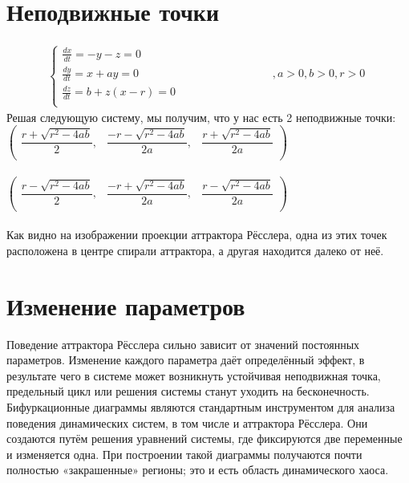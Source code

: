 \documentclass[14pt,a4paper,fleqn]{extarticle}
\begin{document}
\section*{Неподвижные точки}
\begin{align*}
	\begin{cases}
		\frac{dx}{dt} = -y - z = 0\\
		\frac{dy}{dt} = x + ay = 0 \hspace{5cm} , a > 0, b > 0, r > 0\\
		\frac{dz}{dt} = b + z(x - r) = 0\\
	\end{cases}
\end{align*}
Решая следующую систему, мы получим, что у нас есть 2 неподвижные точки:\\
$\begin{pmatrix}
	\dfrac{r + \sqrt{r^2 - 4ab}}{2}, & \dfrac{-r - \sqrt{r^2 - 4ab}}{2a}, & \dfrac{r + \sqrt{r^2 - 4ab}}{2a}\\
\end{pmatrix}$\\\\
$\begin{pmatrix}
	\dfrac{r - \sqrt{r^2 - 4ab}}{2}, & \dfrac{-r + \sqrt{r^2 - 4ab}}{2a}, & \dfrac{r - \sqrt{r^2 - 4ab}}{2a}\\
\end{pmatrix}$\\\\
Как видно на изображении проекции аттрактора Рёсслера, одна из этих точек расположена в центре спирали аттрактора, а другая находится далеко от неё.
\section*{Изменение параметров}
Поведение аттрактора Рёсслера сильно зависит от значений постоянных параметров. Изменение каждого параметра даёт определённый эффект, в результате чего в системе может возникнуть устойчивая неподвижная точка, предельный цикл или решения системы станут уходить на бесконечность.
\newpage
\noindent\makebox[\linewidth]{\rule{\paperwidth}{0.4pt}}
Бифуркационные диаграммы являются стандартным инструментом для анализа поведения динамических систем, в том числе и аттрактора Рёсслера. Они создаются путём решения уравнений системы, где фиксируются две переменные и изменяется одна. При построении такой диаграммы получаются почти полностью «закрашенные» регионы; это и есть область динамического хаоса.\\
\noindent\makebox[\linewidth]{\rule{\paperwidth}{0.4pt}}
\end{document}
